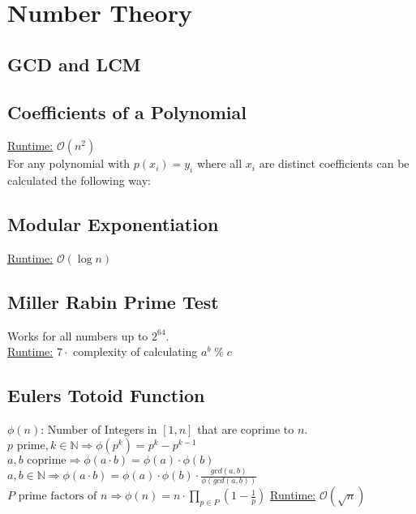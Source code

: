 \section{Number Theory}
\subsection{GCD and LCM}

\subsection{Coefficients of a Polynomial}
\underline{Runtime:} $\mathcal{O}(n^2)$ \\
For any polynomial with $p(x_i) = y_i$ where all $x_i$ are distinct
coefficients can be calculated the following way:
\subsection{Modular Exponentiation}
\underline{Runtime:} $\mathcal{O}(\log n)$

\subsection{Miller Rabin Prime Test}
Works for all numbers up to $2^{64}$.\\
\underline{Runtime:} $7\cdot$ complexity of calculating $a^b \; \% \; c$

\subsection{Eulers Totoid Function}
$\phi(n)$: Number of Integers in $[1, n]$ that are coprime to $n$.\\
$p \text{ prime}, k \in \mathbb{N} \Rightarrow \phi(p^k) = p^k - p^{k-1}$ \\
$a, b \text{ coprime} \Rightarrow \phi(a \cdot b) = \phi(a) \cdot \phi(b)$ \\
$a, b \in \mathbb{N} \Rightarrow \phi(a \cdot b) = \phi(a) \cdot \phi(b) \cdot \frac{gcd(a, b)}{\phi(gcd(a,b))}$ \\
$P \text{ prime factors of } n \Rightarrow \phi(n) = n \cdot \prod_{p \in P} (1 - \frac{1}{p})$
\underline{Runtime:} $\mathcal{O}(\sqrt{n})$


